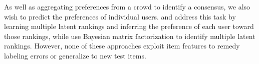 %
As well as aggregating preferences from a crowd to identify a consensus,
we also wish to predict the preferences of individual users.
\citet{yi_inferring_2013} and \citet{kim2014latent} address this task by learning
 multiple latent rankings and inferring
the preference of each user toward those rankings, while 
\citet{salimans2012collaborative} use Bayesian matrix factorization to identify multiple
latent rankings.
However, none of these approaches exploit item features to remedy labeling errors or generalize to new test items.

